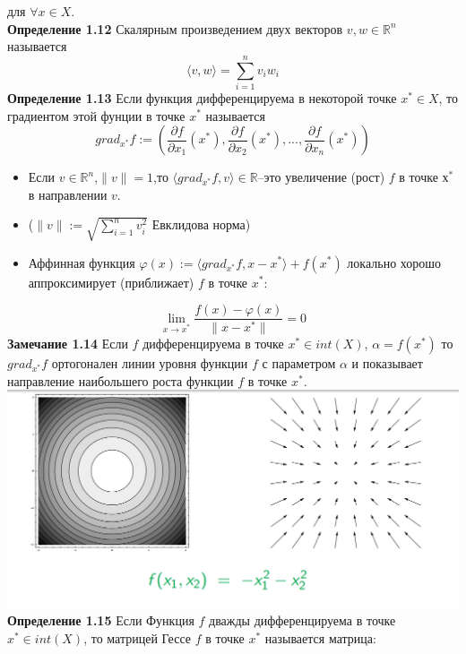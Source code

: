 для $\forall x \in X$.\vspace{.1 cm}\\
\textbf{Определение 1.12} Скалярным произведением двух векторов $v,w \in \mathbb{R}^{n}$ называется
\begin{equation*}
\langle v,w \rangle=\sum_{i=1}^{n} v_i w_i
\end{equation*}
\textbf{Определение 1.13} Если функция дифференцируема в некоторой точке $x^{*} \in X$, то градиентом этой фунции в точке $x^{*}$ называется
\begin{equation*}
grad_{x^{*}}f:=\left( \frac{\partial f}{\partial x_1}\left( x^{*} \right),\frac{\partial f}{\partial x_2}\left( x^{*} \right),...,\frac{\partial f}{\partial x_n}\left( x^{*} \right) \right)
\end{equation*}
\begin{itemize}
\item Если $v \in \mathbb{R}^{n}$,$\|v\|=1$,то $\langle grad_{x^{*}}f,v \rangle \in \mathbb{R}$--это увеличение (рост) $f$ в точке $х^{*}$ в направлении $v$.
\item ($\|v\|:=\sqrt{\sum_{i=1}^{n}v_{i}^{2}}$ Евклидова норма)
\item Аффинная функция $\varphi(x):=\langle grad_{x^{*}}f,x-x^{*} \rangle +f(x^{*}) $ локально хорошо аппроксимирует (приближает) $f$ в точке $x^{*}$:
\end{itemize}
\begin{equation*}
\lim_{x\rightarrow x^{*}} \frac{f(x)-\varphi(x)}{\|x-x^{*}\|}=0
\end{equation*}
\textbf{Замечание 1.14} Если $f$ дифференцируема в точке $ x^{*} \in int(X)$, $\alpha=f\left(x^{*}\right)$ то $grad_{x^{*}} f$ ортогонален линии уровня функции $f$ с параметром $\alpha$ и показывает направление наибольшего роста функции $f$ в точке $x^{*}$.
\includegraphics[scale=0.5]{grad.png}
\textbf{Определение 1.15} Если Функция $f$ дважды дифференцируема в точке $x^{*}\in int(X)$, то матрицей Гессе $f$ в точке $ x^{*}$ называется матрица:

